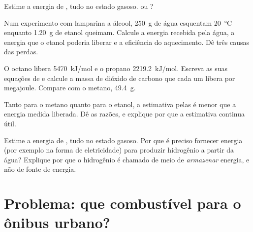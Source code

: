 \begin{exercise}[$\star\star$]\label{exo:g11:reaction-energy:11}
Estime a energia de , tudo no estado gasoso.
 ou ?
\end{exercise}

\begin{exercise}[$\star\star\star$]\label{exo:g11:reaction-energy:12}
Num experimento com lamparina a álcool, \qty{250}{g} de água esquentam
\qty{20}{\celsius} enquanto \qty{1.20}{g} de etanol queimam. Calcule a
energia recebida pela água, a energia que o etanol poderia liberar e a
eficiência do aquecimento. Dê três causas das perdas.
\end{exercise}

\begin{exercise}[$\star\star\star$]\label{exo:g11:reaction-energy:13}
O octano libera \qty{5470}{kJ/mol} e o propano \qty{2219.2}{kJ/mol}.
Escreva as suas equações de  e calcule a massa de dióxido de
carbono que cada um libera por megajoule. Compare com o metano,
\qty{49.4}{g}.
\end{exercise}

\begin{exercise}[$\star\star\star$]\label{exo:g11:reaction-energy:14}
Tanto para o metano quanto para o etanol, a estimativa pelas  é menor que a energia medida liberada. Dê as razões, e explique
por que a estimativa continua útil.
\end{exercise}

\begin{exercise}[$\star\star\star$]\label{exo:g11:reaction-energy:15}
Estime a energia de , tudo no estado gasoso. Por
que é preciso fornecer energia (por exemplo na forma de eletricidade)
para produzir hidrogênio a partir da água? Explique por que o hidrogênio
é chamado de meio de \emph{armazenar} energia, e não de fonte de
energia.
\end{exercise}

\section{Problema: que combustível para o ônibus urbano?}


